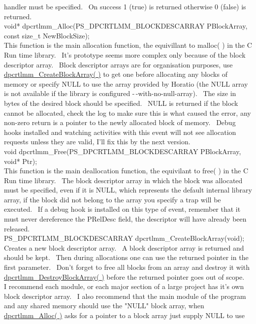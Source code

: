 \documentclass{article}
\begin{document}
handler must be specified.~ On success 1 (true) is returned
otherwise
0 (false) is returned.
\\
void* dpcrtlmm\_Alloc(PS\_DPCRTLMM\_BLOCKDESCARRAY
PBlockArray, const size\_t NewBlockSize);
\\
This function is the main allocation function, the equivillant to
malloc(
) in the C Run time library.~ It's prototype seems more complex
only
because of the block descriptor array.~ Block descriptor arrays
are
for organisation purposes, use \href{#CreateBlockArray}{dpcrtlmm\_CreateBlockArray(
)} to get one before allocating any blocks of memory or specify NULL
to use the array provided by Horatio (the NULL array is not available
if the library is configured -$\,$-with-no-null-array).~ The size in
bytes of
the desired block should be specified.~ NULL is returned if the
block
cannot be allocated, check the log to make sure this is what caused the
error, any non-zero return is a pointer to the newly allocated block of
memory.~ Debug hooks installed and watching activities with this
event
will not see allocation requests unless they are valid, I'll fix this
by
the next version.
\\
void dpcrtlmm\_Free(PS\_DPCRTLMM\_BLOCKDESCARRAY
PBlockArray, void* Ptr);
\\
This function is the main deallocation function, the equivilant to
free( ) in the C Run time library.~ The block descriptor array in
which the block was allocated must be specified, even if it is NULL,
which
represents the default internal library array, if the block did not
belong
to the array you specify a trap will be executed.~ If a debug hook
is installed on this type of event, remember that it must never
dereference
the PRelDesc field, the descriptor will have already been released.
\\
PS\_DPCRTLMM\_BLOCKDESCARRAY
dpcrtlmm\_CreateBlockArray(void);
\\
Creates a new block descriptor array.~ A block descriptor array
is returned and should be kept.~ Then during allocations one can
use
the returned pointer in the first parameter.~ Don't forget to free
all blocks from an array and destroy it with \href{#DestroyBlockArray}{dpcrtlmm\_DestroyBlockArray(
)} before the returned pointer goes out of scope.~ I recommend
each module, or each major section of a large project has it's own
block
descriptor array.~ I also recommend that the main module of the
program
and any shared memory should use the "NULL" block array, when \href{#Alloc}{dpcrtlmm\_Alloc(
)} asks for a pointer to a block array just supply NULL to use
\end{document}
